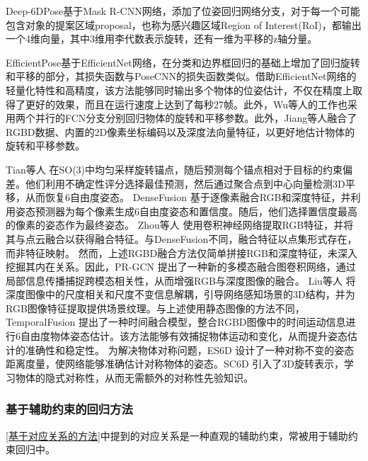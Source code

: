 \par Deep-6DPose\cite{Deep-6DPose}基于Mask R-CNN网络\cite{maskrcnn}，添加了位姿回归网络分支，对于每一个可能包含对象的提案区域proposal，也称为感兴趣区域Region of Interest(RoI)，都输出一个4维向量，其中3维用李代数表示旋转，还有一维为平移的z轴分量。

\par EfficientPose\cite{bukschat2020efficientpose}基于EfficientNet网络\cite{koonce2021efficientnet}，在分类和边界框回归的基础上增加了回归旋转和平移的部分，其损失函数与PoseCNN的损失函数类似。借助EfficientNet网络的轻量化特性和高精度，该方法能够同时输出多个物体的位姿估计，不仅在精度上取得了更好的效果，而且在运行速度上达到了每秒27帧。此外，Wu等人的工作\cite{wu2018real}也采用两个并行的FCN\cite{FCN}分支分别回归物体的旋转和平移参数。此外，Jiang等人\cite{jiang2022uni6d}融合了RGBD数据、内置的2D像素坐标编码以及深度法向量特征，以更好地估计物体的旋转和平移参数。

Tian等人\cite{tian2020robust} 在SO(3)中均匀采样旋转锚点，随后预测每个锚点相对于目标的约束偏差。他们利用不确定性评分选择最佳预测，然后通过聚合点到中心向量检测3D平移，从而恢复6自由度姿态。
DenseFusion\cite{wang2019densefusion} 基于逐像素融合RGB和深度特征，并利用姿态预测器为每个像素生成6自由度姿态和置信度。随后，他们选择置信度最高的像素的姿态作为最终姿态。
Zhou等人\cite{zhou2020novel} 使用卷积神经网络提取RGB特征，并将其与点云融合以获得融合特征。与DenseFusion\cite{wang2019densefusion}不同，融合特征以点集形式存在，而非特征映射。
然而，上述RGBD融合方法仅简单拼接RGB和深度特征，未深入挖掘其内在关系。因此，PR-GCN\cite{Zhou2021PRGCNAD} 提出了一种新的多模态融合图卷积网络，通过局部信息传播捕捉跨模态相关性，从而增强RGB与深度图像的融合。
Liu等人\cite{liu2023depth} 将深度图像中的尺度相关和尺度不变信息解耦，引导网络感知场景的3D结构，并为RGB图像特征提取提供场景纹理。与上述使用静态图像的方法不同，TemporalFusion\cite{mu2021temporalfusion} 提出了一种时间融合模型，整合RGBD图像中的时间运动信息进行6自由度物体姿态估计。该方法能够有效捕捉物体运动和变化，从而提升姿态估计的准确性和稳定性。
为解决物体对称问题，ES6D\cite{mo2022es6d} 设计了一种对称不变的姿态距离度量，使网络能够准确估计对称物体的姿态。SC6D\cite{cai2022sc6d} 引入了3D旋转表示，学习物体的隐式对称性，从而无需额外的对称性先验知识。

\subsubsection{基于辅助约束的回归方法}\label{基于辅助约束的回归方法}

\par \autoref{基于对应关系的方法}中提到的对应关系是一种直观的辅助约束，常被用于辅助约束回归中。

